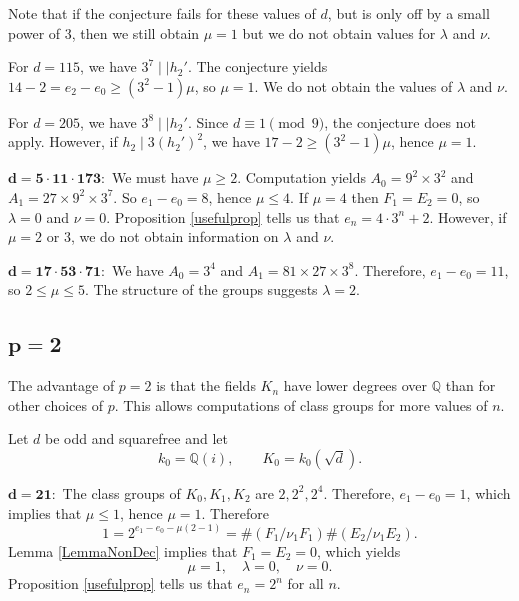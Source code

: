 \documentclass{amsart}
\begin{document}
Note that if the conjecture fails for these values of $d$, but is only off by a small power of 3, then we still obtain $\mu=1$ but we do not obtain values
for $\lambda$ and $\nu$.

For $d=115$, we have $3^7\mid\mid h_2'$. The conjecture yields $14-2=e_2-e_0\ge (3^2-1)\mu$, so $\mu=1$. We do not obtain the values of $\lambda$ and $\nu$.

For $d=205$, we have $3^8\mid\mid h_2'$. Since $d\equiv 1\pmod 9$, the conjecture does not apply. However, if $h_2\mid 3(h_2')^2$, we have $17-2\ge (3^2-1)\mu$, hence $\mu=1$. 


\medskip
\noindent
$\mathbf{d=5\cdot 11\cdot 173:}$ We must have $\mu\ge 2$. Computation yields
$A_0= 9^2 \times 3^2$  and  $A_1= 27 \times 9^2 \times 3^7$.
So $e_1-e_0=8$, hence $\mu\le 4$. 
If $\mu=4$ then $F_1=E_2=0$, so $\lambda=0$ and $\nu=0$. Proposition \ref{usefulprop}
tells us that $e_n=4\cdot 3^n +2$. However, if
$\mu=2$ or $3$, we do not obtain information on $\lambda$ and $\nu$.


\medskip
\noindent
$\mathbf{d=17\cdot 53\cdot 71:}$ We have $A_0 = 3^4$ and $A_1= 81\times 27\times 3^8$. Therefore,
$e_1-e_0=11$, so $2\le \mu \le 5$. The structure of the groups suggests $\lambda=2$.

\medskip

\subsection{$\mathbf{p=2}$}

The advantage of $p=2$ is that the fields $K_n$ have lower degrees over $\mathbb Q$ than for other choices of $p$.
This allows computations of class groups for more values of $n$.

Let $d$ be odd and squarefree and let 
$$k_0=\mathbb Q(i),\qquad K_0=k_0(\sqrt{d}).$$


\medskip

\noindent
$\mathbf{d=21:}$ The class groups of $K_0, K_1, K_2$ are $2, 2^2, 2^4$. Therefore, $e_1-e_0=1$, which implies 
that $\mu\le 1$, hence $\mu=1$. Therefore
$$
1=2^{e_1-e_0-\mu(2-1)}=\#(F_1/\nu_1F_1)\#(E_2/\nu_1E_2).
$$
Lemma \ref{LemmaNonDec} implies that $F_1=E_2=0$, which yields  
$$
\mu=1, \quad \lambda=0, \quad \nu=0.
$$
Proposition \ref{usefulprop} tells us that $e_n=2^n$ for all $n$.
\medskip
\end{document}

